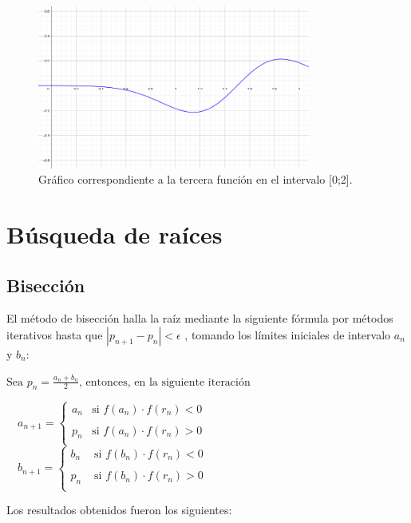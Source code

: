 \documentclass[titlepage,a4paper]{article}
\begin{document}
\begin{figure}[H]
\centering
\includegraphics[width=0.8\textwidth]{funcion3.png}
\caption{\label{fig:class01}Gráfico correspondiente a la tercera función en el intervalo [0;2].}
\end{figure}

\section{Búsqueda de raíces}\label{sec:busqueda_raices}

\subsection{Bisección}\label{sec:biseccion}
El método de bisección halla la raíz mediante la siguiente fórmula por métodos iterativos hasta que 
$ |p_{n+1} - p_{n}| < \mbox{$\epsilon$} $ , tomando los límites iniciales de intervalo ${a_n}$ y ${b_n}$:

\smallskip

$\mbox{Sea }p_n = \frac{a_n+b_n}{2}\mbox{, entonces, en la siguiente iteración}$
\begin{center}
    $
    \quad a_{n+1} =\left\{ \begin{array}{lcc}
                 a_n & \mbox{si } f(a_n)\cdot f(r_n) <0 \\
                 \\ p_n & \mbox{si } f(a_n)\cdot f(r_n) > 0 \\
                 \end{array}
       \right. 
    $
    $
    \quad b_{n+1} =\left\{ \begin{array}{lcc}
                 b_n & \mbox{ si } f(b_n)\cdot f(r_n) < 0 \\
                 \\p_n & \mbox{ si } f(b_n)\cdot f(r_n) > 0 \\
                 \end{array}
       \right.
    $
\end{center}
\smallskip
Los resultados obtenidos fueron los siguientes:
\end{document}
